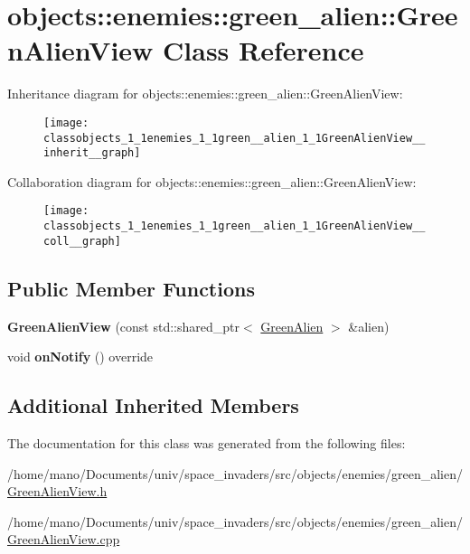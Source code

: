 \hypertarget{classobjects_1_1enemies_1_1green__alien_1_1GreenAlienView}{}\section{objects\+:\+:enemies\+:\+:green\+\_\+alien\+:\+:Green\+Alien\+View Class Reference}
\label{classobjects_1_1enemies_1_1green__alien_1_1GreenAlienView}


Inheritance diagram for objects\+:\+:enemies\+:\+:green\+\_\+alien\+:\+:Green\+Alien\+View\+:\nopagebreak
\begin{figure}[H]
\begin{center}
\leavevmode
\texttt{[image: classobjects\_1\_1enemies\_1\_1green\_\_alien\_1\_1GreenAlienView\_\_inherit\_\_graph]}
\end{center}
\end{figure}


Collaboration diagram for objects\+:\+:enemies\+:\+:green\+\_\+alien\+:\+:Green\+Alien\+View\+:\nopagebreak
\begin{figure}[H]
\begin{center}
\leavevmode
\texttt{[image: classobjects\_1\_1enemies\_1\_1green\_\_alien\_1\_1GreenAlienView\_\_coll\_\_graph]}
\end{center}
\end{figure}
\subsection*{Public Member Functions}
\begin{DoxyCompactItemize}
\item 
\mbox{\label{classobjects_1_1enemies_1_1green__alien_1_1GreenAlienView_a3db2841587821504e4073cef87cf7dc1}}
{\bfseries Green\+Alien\+View} (const std\+::shared\+\_\+ptr$<$ \hyperlink{classobjects_1_1enemies_1_1green__alien_1_1GreenAlien}{Green\+Alien} $>$ \&alien)
\item 
\mbox{\label{classobjects_1_1enemies_1_1green__alien_1_1GreenAlienView_a18e2193d589d73e6449b14bfe2e2e99e}}
void {\bfseries on\+Notify} () override
\end{DoxyCompactItemize}
\subsection*{Additional Inherited Members}


The documentation for this class was generated from the following files\+:\begin{DoxyCompactItemize}
\item 
/home/mano/\+Documents/univ/space\+\_\+invaders/src/objects/enemies/green\+\_\+alien/\hyperlink{GreenAlienView_8h}{Green\+Alien\+View.\+h}\item
/home/mano/\+Documents/univ/space\+\_\+invaders/src/objects/enemies/green\+\_\+alien/\hyperlink{GreenAlienView_8cpp}{Green\+Alien\+View.\+cpp}\end{DoxyCompactItemize}
